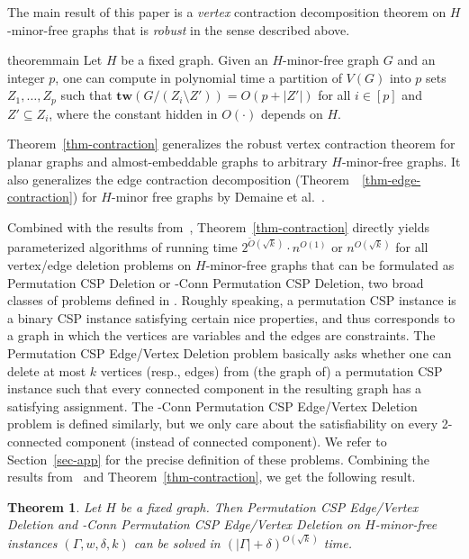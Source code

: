 \documentclass[a4paper,11pt]{article}
\numberwithin{lemma}{section}
\newtheorem{theorem}[lemma]{Theorem}
\newcommand{\tw}{\mathbf{tw}}
\begin{document}
The main result of this paper is a \emph{vertex} contraction decomposition theorem on $H$-minor-free graphs that is \emph{robust} in the sense described above.

\begin{restatable}{theorem}{main}
 \label{thm-contraction}
 Let $H$ be a fixed graph.
 Given an $H$-minor-free graph $G$ and an integer $p$, one can compute in polynomial time a partition of $V(G)$ into $p$ sets $Z_1,\dots,Z_p$ such that $\tw(G/(Z_i \setminus Z')) = O(p + |Z'|)$ for all $i \in [p]$ and $Z' \subseteq Z_i$, where the constant hidden in $O(\cdot)$ depends on $H$.
\end{restatable}

Theorem~\ref{thm-contraction} generalizes the robust vertex contraction theorem for planar graphs \cite{MarxMNT22} and almost-embeddable graphs \cite{BandyapadhyayLLSJ22} to arbitrary $H$-minor-free graphs.
It also generalizes the edge contraction decomposition (Theorem~~\ref{thm-edge-contraction}) for $H$-minor free graphs by Demaine et al.~\cite{DemaineHK11}.

Combined with the results from~\cite{MarxMNT22}, Theorem~\ref{thm-contraction} directly yields parameterized algorithms of running time $2^{\widetilde{O}(\sqrt{k})} \cdot n^{O(1)}$ or $n^{O(\sqrt{k})}$ for all vertex/edge deletion problems on $H$-minor-free graphs that can be formulated as {\sc Permutation CSP Deletion} or {-Conn Permutation CSP Deletion}, two broad classes of problems defined in \cite{MarxMNT22}.
Roughly speaking, a permutation CSP instance is a binary CSP instance satisfying certain nice properties, and thus corresponds to a graph in which the vertices are variables and the edges are constraints.
The {\sc Permutation CSP Edge/Vertex Deletion} problem basically asks whether one can delete at most $k$ vertices (resp., edges) from (the graph of) a permutation CSP instance such that every connected component in the resulting graph has a satisfying assignment.
The {-Conn Permutation CSP Edge/Vertex Deletion} problem is defined similarly, but we only care about the satisfiability on every 2-connected component (instead of connected component).
We refer to Section~\ref{sec-app} for the precise definition of these problems.
Combining the results from~\cite{MarxMNT22} and Theorem~\ref{thm-contraction}, we get the following result.

\begin{theorem}\label{thm-app}
 Let $H$ be a fixed graph.
 Then {\sc Permutation CSP Edge/Vertex Deletion} and {-Conn Permutation CSP Edge/Vertex Deletion} on $H$-minor-free instances $(\varGamma,w,\delta,k)$ can be solved in $(|\varGamma|+\delta)^{O(\sqrt{k})}$ time.
\end{theorem}
\end{document}
